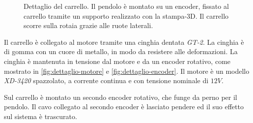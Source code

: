 \begin{figure}
    \centering
    \caption[Dettaglio del carrello]{Dettaglio del carrello. Il pendolo è montato
    su un encoder, fissato al carrello tramite un supporto realizzato con la
    stampa-3D. Il carrello scorre sulla rotaia grazie alle ruote laterali.}
    \label{fig:dettaglio-carrello}
\end{figure}

Il carrello è collegato al motore tramite una cinghia dentata \emph{GT-2}.
La cinghia è di gomma con un cuore di metallo, in modo da resistere
alle deformazioni. La cinghia è mantenuta in tensione dal motore e da un
encoder rotativo, come mostrato in \autoref{fig:dettaglio-motore} e
\autoref{fig:dettaglio-encoder}. Il motore è un modello \emph{XD-3420}
spazzolato, a corrente continua e con tensione nominale di $12V$.

Sul carrello è montato un secondo encoder rotativo,
che funge da perno per il pendolo. Il cavo collegato al secondo encoder è lasciato pendere ed il suo effetto sul sistema è trascurato.

